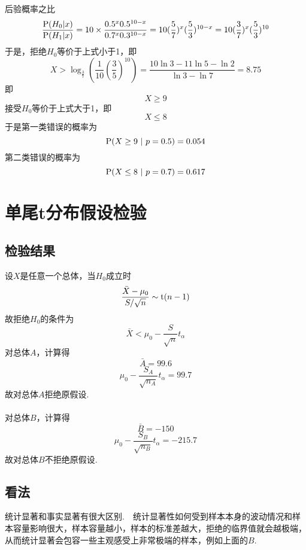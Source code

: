 \documentclass{article}
\begin{document}
\begin{CJK}{UTF8}{gbsn}
\subsection{}
后验概率之比
$$ \frac{{\rm P}(H_{0}\vert x)}{{\rm P}(H_{1}\vert x)}=10\times\frac{0.5^{x}0.5^{10-x}}{0.7^{x}0.3^{10-x}}=10(\frac{5}{7})^{x}(\frac{5}{3})^{10-x}=10(\frac{3}{7})^{x}(\frac{5}{3})^{10}$$
于是，拒绝$H_{0}$等价于上式小于1，即
$$ X>\log_{\frac{3}{7}}(\frac{1}{10}(\frac{3}{5})^{10})=\frac{10\ln3-11\ln5-\ln2}{\ln3-\ln7}=8.75$$
即
$$ X\geq 9 $$
接受$H_{0}$等价于上式大于1，即
$$ X\leq 8 $$
于是第一类错误的概率为
$$ {\rm P}(X\geq 9\ \vert\ p=0.5)=0.054$$
第二类错误的概率为
$$ {\rm P}(X\leq 8\ \vert\ p=0.7)=0.617$$
\section{单尾t分布假设检验}
\subsection{检验结果}
设$X$是任意一个总体，当$H_{0}$成立时
$$\frac{\bar{X}-\mu_{0}}{S/\sqrt{n}}\sim{\rm t}(n-1) $$
故拒绝$H_{0}$的条件为
$$ \bar{X}<\mu_{0}-\frac{S}{\sqrt{n}}t_{\alpha}$$
对总体$A$，计算得
$$ \bar{A}=99.6 $$
$$ \mu_{0}-\frac{S_{A}}{\sqrt{n_{A}}}t_{\alpha}=99.7 $$
故对总体$A$拒绝原假设.\\\\
对总体$B$，计算得
$$ \bar{B}=-150 $$
$$ \mu_{0}-\frac{S_{B}}{\sqrt{n_{B}}}t_{\alpha}=-215.7 $$
故对总体$B$不拒绝原假设.
\subsection{看法}
统计显著和事实显著有很大区别.\ \ 统计显著性如何受到样本本身的波动情况和样本容量影响很大，样本容量越小，样本的标准差越大，拒绝的临界值就会越极端，从而统计显著会包容一些主观感受上非常极端的样本，例如上面的$B$.
\end{CJK}
\end{document}
